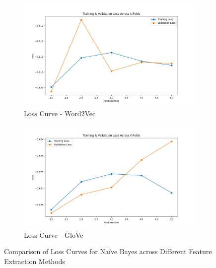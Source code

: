 \begin{figure}[H]
    \begin{subfigure}[b]{0.48\textwidth}
        \includegraphics[width=\textwidth]{img/report_info/img/3.1.NaiveBayes/best_bayesian_word2vec_loss.png}
        \caption{Loss Curve - Word2Vec}
        \label{fig:nb-word2vec-loss}
    \end{subfigure}
    \begin{subfigure}[b]{0.48\textwidth}
        \includegraphics[width=\textwidth]{img/report_info/img/3.1.NaiveBayes/best_bayesian_glove_loss.png}
        \caption{Loss Curve - GloVe}
        \label{fig:nb-glove-loss}
    \end{subfigure}
    
    \caption{Comparison of Loss Curves for Naïve Bayes across Different Feature Extraction Methods}
    \label{fig:nb-loss-group}
\end{figure}


